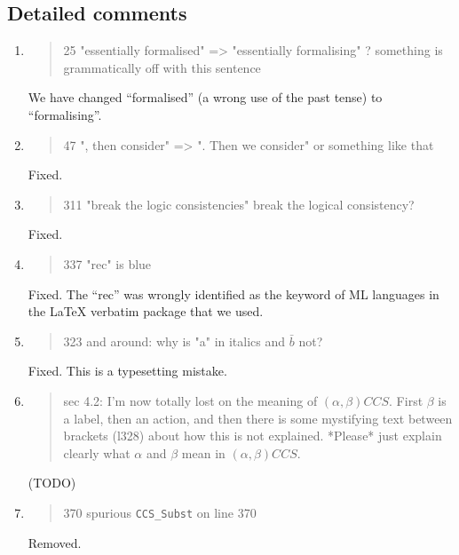 \subsection*{Detailed comments}

\begin{enumerate}
  \item \begin{quote}
25 "essentially formalised" => "essentially formalising" ? something is grammatically off with this sentence
\end{quote}
  \Mark We have changed ``formalised'' (a wrong use of the past tense) to ``formalising''. 

  \item \begin{quote}
47 ", then consider" => ". Then we consider" or something like that
\end{quote}
  \Mark Fixed.

  \item \begin{quote}
311 "break the logic consistencies" break the logical consistency?
\end{quote}
  \Mark Fixed.

  \item \begin{quote}
337 "rec" is blue
\end{quote}
  \Mark Fixed. The ``rec'' was wrongly identified as the keyword of ML
  languages in the \LaTeX{} verbatim package that we used.

  \item \begin{quote}
323 and around: why is "a" in italics and $\bar{b}$ not?
\end{quote}
  \Mark Fixed. This is a typesetting mistake.

  \item \begin{quote}
sec 4.2: I'm now totally lost on the meaning of $(\alpha, \beta) CCS$. First $\beta$ is a label, then an action, and then there is some mystifying text between brackets (l328) about how this is not explained. *Please* just explain clearly what $\alpha$ and $\beta$ mean in $(\alpha, \beta) CCS$. 
\end{quote}
  \Mark (TODO)

  \item \begin{quote}
370 spurious \texttt{CCS_Subst} on line 370
\end{quote}
  \Mark Removed.


\end{enumerate}
